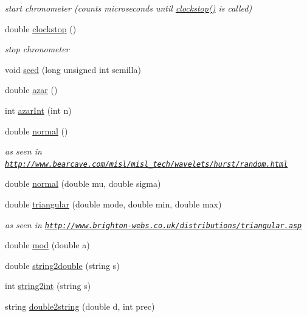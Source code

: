 \begin{DoxyCompactItemize}
\begin{DoxyCompactList}\small\item\em start chronometer (counts microseconds until \hyperlink{classtoolbox_a8fe27f13cb254a568c8ec0295e5a734f}{clockstop()} is called) \end{DoxyCompactList}\item 
double \hyperlink{classtoolbox_a8fe27f13cb254a568c8ec0295e5a734f}{clockstop} ()
\begin{DoxyCompactList}\small\item\em stop chronometer \end{DoxyCompactList}\item 
void \hyperlink{classtoolbox_a4ea98edf9956998c061850754a37281d}{seed} (long unsigned int semilla)
\item 
double \hyperlink{classtoolbox_a7b24111985e7dcac53f092e954e0cc07}{azar} ()
\item 
int \hyperlink{classtoolbox_ada9e591755dfbbf32979bc1d3f2f81c6}{azar\+Int} (int n)
\item 
double \hyperlink{classtoolbox_a67450c1434f5b2f278c37b6f78f6c91d}{normal} ()
\begin{DoxyCompactList}\small\item\em as seen in \href{http://www.bearcave.com/misl/misl_tech/wavelets/hurst/random.html}{\tt http\+://www.\+bearcave.\+com/misl/misl\+\_\+tech/wavelets/hurst/random.\+html} \end{DoxyCompactList}\item 
double \hyperlink{classtoolbox_a30631661b56eb3e11b40c118241ba6f6}{normal} (double mu, double sigma)
\item 
double \hyperlink{classtoolbox_a76420d97756e45135baa61e037e03d20}{triangular} (double mode, double min, double max)
\begin{DoxyCompactList}\small\item\em as seen in \href{http://www.brighton-webs.co.uk/distributions/triangular.asp}{\tt http\+://www.\+brighton-\/webs.\+co.\+uk/distributions/triangular.\+asp} \end{DoxyCompactList}\item 
double \hyperlink{classtoolbox_a0daf970243cd9158552300762de3f801}{mod} (double a)
\item 
double \hyperlink{classtoolbox_a1347524ce4a6b1db516421f1c2905e44}{string2double} (string s)
\item 
int \hyperlink{classtoolbox_a86769fb57c8a0b58b14a9946a0c90043}{string2int} (string s)
\item 
string \hyperlink{classtoolbox_afb97b8bab923a8c293ff5aa944ed64f7}{double2string} (double d, int prec)

\end{DoxyCompactItemize}
